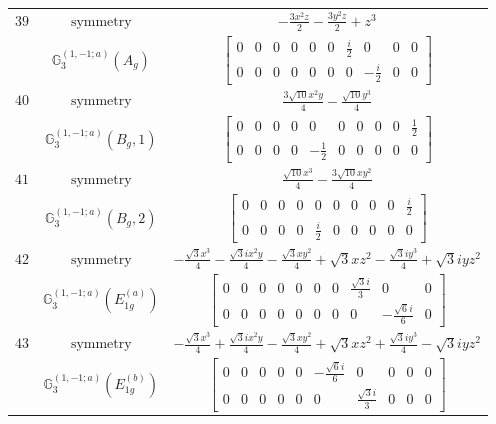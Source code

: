 \documentclass[fleqn,8pt,landscape]{jsarticle}
\begin{document}
\begin{longtable}{ccc}
$ 39 $ & $ \text{symmetry} $ & $ - \frac{3 x^{2} z}{2} - \frac{3 y^{2} z}{2} + z^{3} $ \\
$  $ & $ \mathbb{G}_{3}^{(1,-1;a)}(A_{g}) $ & $ \begin{bmatrix} 0 & 0 & 0 & 0 & 0 & 0 & \frac{i}{2} & 0 & 0 & 0 \\ 0 & 0 & 0 & 0 & 0 & 0 & 0 & - \frac{i}{2} & 0 & 0 \end{bmatrix} $ \\ \hline
$ 40 $ & $ \text{symmetry} $ & $ \frac{3 \sqrt{10} x^{2} y}{4} - \frac{\sqrt{10} y^{3}}{4} $ \\
$  $ & $ \mathbb{G}_{3}^{(1,-1;a)}(B_{g},1) $ & $ \begin{bmatrix} 0 & 0 & 0 & 0 & 0 & 0 & 0 & 0 & 0 & \frac{1}{2} \\ 0 & 0 & 0 & 0 & - \frac{1}{2} & 0 & 0 & 0 & 0 & 0 \end{bmatrix} $ \\ \hline
$ 41 $ & $ \text{symmetry} $ & $ \frac{\sqrt{10} x^{3}}{4} - \frac{3 \sqrt{10} x y^{2}}{4} $ \\
$  $ & $ \mathbb{G}_{3}^{(1,-1;a)}(B_{g},2) $ & $ \begin{bmatrix} 0 & 0 & 0 & 0 & 0 & 0 & 0 & 0 & 0 & \frac{i}{2} \\ 0 & 0 & 0 & 0 & \frac{i}{2} & 0 & 0 & 0 & 0 & 0 \end{bmatrix} $ \\ \hline
$ 42 $ & $ \text{symmetry} $ & $ - \frac{\sqrt{3} x^{3}}{4} - \frac{\sqrt{3} i x^{2} y}{4} - \frac{\sqrt{3} x y^{2}}{4} + \sqrt{3} x z^{2} - \frac{\sqrt{3} i y^{3}}{4} + \sqrt{3} i y z^{2} $ \\
$  $ & $ \mathbb{G}_{3}^{(1,-1;a)}(E_{1g}^{(a)}) $ & $ \begin{bmatrix} 0 & 0 & 0 & 0 & 0 & 0 & 0 & \frac{\sqrt{3} i}{3} & 0 & 0 \\ 0 & 0 & 0 & 0 & 0 & 0 & 0 & 0 & - \frac{\sqrt{6} i}{6} & 0 \end{bmatrix} $ \\ \hline
$ 43 $ & $ \text{symmetry} $ & $ - \frac{\sqrt{3} x^{3}}{4} + \frac{\sqrt{3} i x^{2} y}{4} - \frac{\sqrt{3} x y^{2}}{4} + \sqrt{3} x z^{2} + \frac{\sqrt{3} i y^{3}}{4} - \sqrt{3} i y z^{2} $ \\
$  $ & $ \mathbb{G}_{3}^{(1,-1;a)}(E_{1g}^{(b)}) $ & $ \begin{bmatrix} 0 & 0 & 0 & 0 & 0 & - \frac{\sqrt{6} i}{6} & 0 & 0 & 0 & 0 \\ 0 & 0 & 0 & 0 & 0 & 0 & \frac{\sqrt{3} i}{3} & 0 & 0 & 0 \end{bmatrix} $ \\ \hline

\end{longtable}
\end{document}
